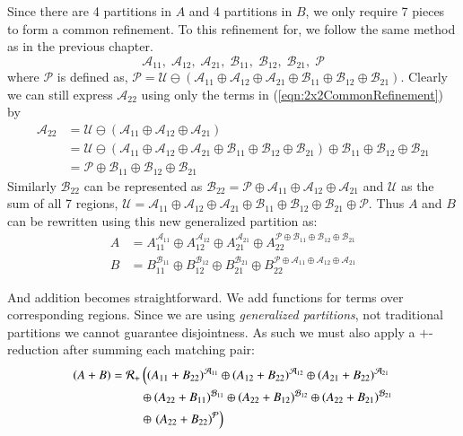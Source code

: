 Since there are 4 partitions in $A$ and 4 partitions in $B$, we only require 7 pieces to form a common refinement.
To this refinement for, we follow the same method as in the previous chapter.
\begin{equation}
	\label{eqn:2x2CommonRefinement}
	\mathcal{A}_{11}, \; \mathcal{A}_{12}, \;  \mathcal{A}_{21}, \;
	\mathcal{B}_{11}, \; \mathcal{B}_{12}, \; \mathcal{B}_{21}, \; \mathcal{P}
\end{equation}
where $\mathcal{P}$ is defined as,
$\mathcal{P} = \mathcal{U} 
		\ominus (\mathcal{A}_{11} \oplus \mathcal{A}_{12} \oplus \mathcal{A}_{21} \oplus
				\mathcal{B}_{11} \oplus \mathcal{B}_{12} \oplus \mathcal{B}_{21})$.
Clearly we can still express $\mathcal{A}_{22}$ using only the terms in (\ref{eqn:2x2CommonRefinement}) by
\begin{align*}
	\mathcal{A}_{22} &= \mathcal{U} \ominus (\mathcal{A}_{11} \oplus \mathcal{A}_{12} \oplus \mathcal{A}_{21})\\
		& = \mathcal{U} \ominus (\mathcal{A}_{11} \oplus \mathcal{A}_{12} \oplus \mathcal{A}_{21} \oplus \mathcal{B}_{11} \oplus \mathcal{B}_{12} \oplus \mathcal{B}_{21}) \oplus \mathcal{B}_{11} \oplus \mathcal{B}_{12} \oplus \mathcal{B}_{21}\\
		&= \mathcal{P} \oplus \mathcal{B}_{11} \oplus \mathcal{B}_{12} \oplus \mathcal{B}_{21}
\end{align*}
Similarly $\mathcal{B}_{22}$ can be represented as $\mathcal{B}_{22} = \mathcal{P} \oplus \mathcal{A}_{11} \oplus \mathcal{A}_{12} \oplus \mathcal{A}_{21}$
and $\mathcal{U}$ as the sum of all 7 regions, 
$\mathcal{U} = 	\mathcal{A}_{11} \oplus \mathcal{A}_{12} \oplus \mathcal{A}_{21} \oplus 
				\mathcal{B}_{11} \oplus \mathcal{B}_{12} \oplus \mathcal{B}_{21} \oplus \mathcal{P}$.
Thus $A$ and $B$ can be rewritten using this new generalized partition as:
\begin{align*}
	A &= A_{11}^{\mathcal{A}_{11}} \oplus 
		A_{12}^{\mathcal{A}_{12}} \oplus 
		A_{21}^{\mathcal{A}_{21}} \oplus 
		A_{22}^{\mathcal{P} \oplus \mathcal{B}_{11} \oplus \mathcal{B}_{12} \oplus \mathcal{B}_{21}} \\
	B &= B_{11}^{\mathcal{B}_{11}} \oplus 
		B_{12}^{\mathcal{B}_{12}} \oplus 
		B_{21}^{\mathcal{B}_{21}} \oplus 
		B_{22}^{\mathcal{P} \oplus \mathcal{A}_{11} \oplus \mathcal{A}_{12} \oplus \mathcal{A}_{21}} 
\end{align*}

And addition becomes straightforward. 
We add functions for terms over corresponding regions.
Since we are using \emph{generalized partitions}, not traditional partitions we cannot guarantee disjointness.
As such we must also apply a $+$-reduction after summing each matching pair:
\begin{align*}
	(A+B) = \R[+] & \left(  (A_{11}+B_{22})^{\mathcal{A}_{11}} \oplus 
		(A_{12} + B_{22})^{\mathcal{A}_{12}} \oplus 
		(A_{21} + B_{22})^{\mathcal{A}_{21}} \right. \\ &\oplus 
		(A_{22} + B_{11})^{\mathcal{B}_{11}} \oplus 
		(A_{22} + B_{12})^{\mathcal{B}_{12}} \oplus 
		(A_{22} + B_{21})^{\mathcal{B}_{21}} \\ &\oplus
		\left.(A_{22} + B_{22})^{\mathcal{P}} \right)
\end{align*}

